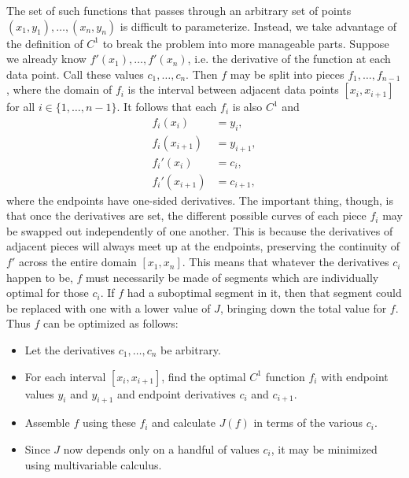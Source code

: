 \documentclass{article}
\begin{document}
The set of such functions that passes through an arbitrary set of points
$(x_1, y_1), \ldots, (x_n, y_n)$ is difficult to parameterize.
Instead, we take advantage of the definition of $C^1$
to break the problem into more manageable parts.
Suppose we already know $f'(x_1), \ldots, f'(x_n)$,
i.e. the derivative of the function at each data point.
Call these values $c_1, \ldots, c_n$.
Then $f$ may be split into pieces $f_1, \ldots, f_{n-1}$,
where the domain of $f_i$ is the interval between adjacent data points $[x_i, x_{i+1}]$
for all $i \in \{1, \ldots, n-1\}$.
It follows that each $f_i$ is also $C^1$ and
\begin{align*}
  f_i(x_i) &= y_i, \\
  f_i(x_{i+1}) &= y_{i+1}, \\
  f_i'(x_i) &= c_i, \\
  f_i'(x_{i+1}) &= c_{i+1},
\end{align*}
where the endpoints have one-sided derivatives.
The important thing, though, is that once the derivatives are set,
the different possible curves of each piece $f_i$
may be swapped out independently of one another.
This is because the derivatives of adjacent pieces will always meet up at the endpoints,
preserving the continuity of $f'$ across the entire domain $[x_1, x_n]$.
This means that whatever the derivatives $c_i$ happen to be,
$f$ must necessarily be made of segments which are individually optimal for those $c_i$.
If $f$ had a suboptimal segment in it,
then that segment could be replaced with one with a lower value of $J$,
bringing down the total value for $f$.
Thus $f$ can be optimized as follows:
\begin{itemize}
\item
  Let the derivatives $c_1, \ldots, c_n$ be arbitrary.
\item
  For each interval $[x_i, x_{i+1}]$, find the optimal $C^1$ function $f_i$
  with endpoint values $y_i$ and $y_{i+1}$
  and endpoint derivatives $c_i$ and $c_{i+1}$.
\item
  Assemble $f$ using these $f_i$ and calculate $J(f)$ in terms of the various $c_i$.
\item
  Since $J$ now depends only on a handful of values $c_i$,
  it may be minimized using multivariable calculus.
\end{itemize}
\end{document}
